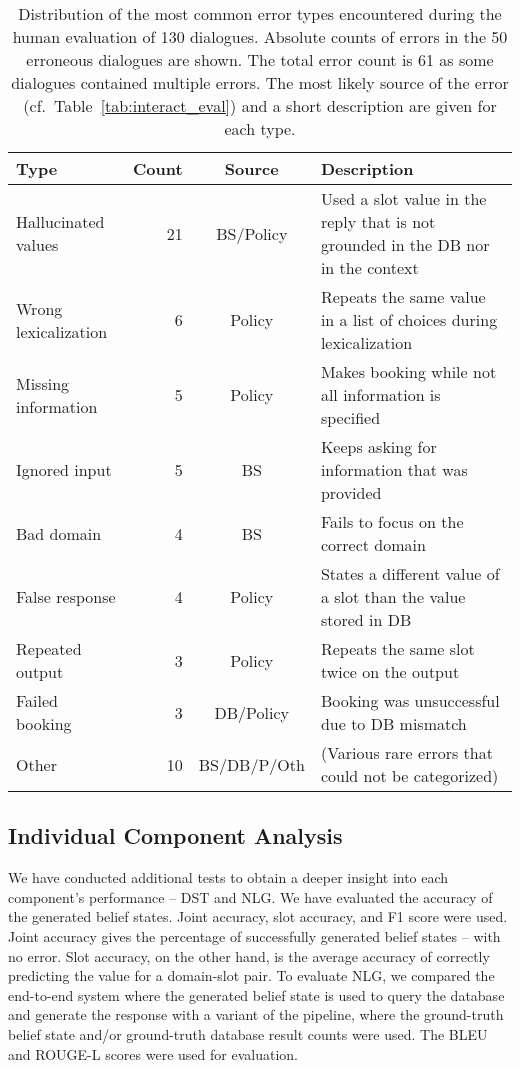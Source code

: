 \documentclass[11pt]{article}
\begin{document}
\begin{table*}[t]
\centering\small
\begin{tabularx}{\textwidth}{lrcX}
\toprule
Type & Count & Source & Description \\
\midrule
Hallucinated values & 21 & BS/Policy & Used a slot value in the reply that is not grounded in the DB nor in the context \\
Wrong lexicalization & 6 & Policy & Repeats the same value in a list of choices during lexicalization  \\
Missing information & 5 & Policy & Makes booking while not all information is specified \\
Ignored input  & 5& BS & Keeps asking for information that was provided \\
Bad domain     & 4 & BS  & Fails to focus on the correct domain \\
False response & 4 & Policy & States a different value of a slot than the value stored in DB \\
Repeated output& 3 & Policy & Repeats the same slot twice on the output \\
Failed booking & 3 & DB/Policy & Booking was unsuccessful due to DB mismatch\\
Other          &10 & BS/DB/P/Oth & (Various rare errors that could not be categorized) \\
\bottomrule
\end{tabularx}
\caption{Distribution of the most common error types encountered during the human evaluation of 130 dialogues. Absolute counts of errors in the 50 erroneous dialogues are shown. The total error count is 61 as some dialogues contained multiple errors. The most likely source of the error (cf.~Table~\ref{tab:interact_eval}) and a short description are given for each type.}
\label{tab:detailed_eval}
\end{table*}


\subsection{Individual Component Analysis}
We have conducted additional tests to obtain a deeper insight into each component's performance -- DST and NLG. We have evaluated the accuracy of the generated belief states. Joint accuracy, slot accuracy, and F1 score were used. Joint accuracy gives the percentage of successfully generated belief states -- with no error. Slot accuracy, on the other hand, is the average accuracy of correctly predicting the value for a domain-slot pair. To evaluate NLG, we compared the end-to-end system where the generated belief state is used to query the database and generate the response with a variant of the pipeline, where the ground-truth belief state and/or ground-truth database result counts were used. The BLEU \citep{papineni2002} and ROUGE-L \citep{lin2004rouge} scores were used for evaluation.
\end{document}
